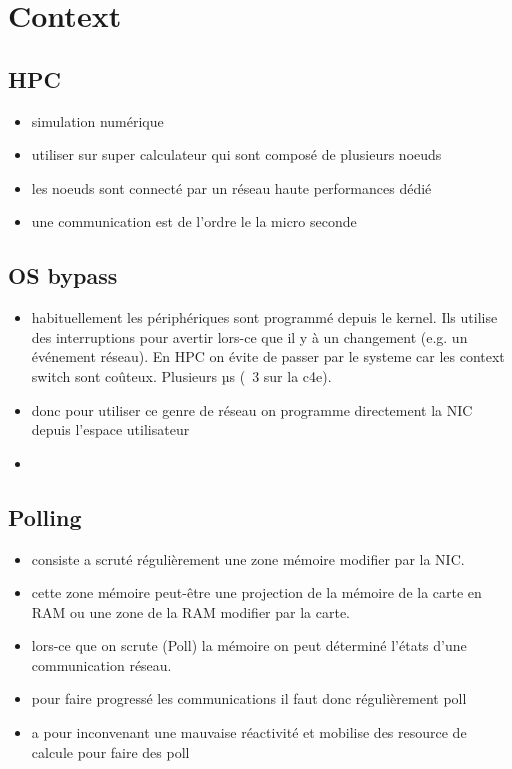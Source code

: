 \section{Context}

\subsection{HPC}

\begin{itemize}
  \item simulation numérique
  \item utiliser sur super calculateur qui sont composé de plusieurs noeuds
  \item les noeuds sont connecté par un réseau haute performances dédié
  \item une communication est de l'ordre le la micro seconde
\end{itemize}

\subsection{OS bypass}

\begin{itemize}
  \item habituellement les périphériques sont programmé depuis le kernel.
  Ils utilise des interruptions pour avertir lors-ce que il y à un changement (e.g. un événement réseau).
  En HPC on évite de passer par le systeme car les context switch sont coûteux.
  Plusieurs µs (~3 sur la c4e).
  \item donc pour utiliser ce genre de réseau on programme directement la NIC depuis l'espace utilisateur
  \item 
\end{itemize}

\subsection{Polling}

\begin{itemize}
  \item consiste a scruté régulièrement une zone mémoire modifier par la NIC.
  \item cette zone mémoire peut-être une projection de la mémoire de la carte en RAM ou une zone de la RAM modifier par la carte.
  \item lors-ce que on scrute (Poll) la mémoire on peut déterminé l'états d'une communication réseau.
  \item pour faire progressé les communications il faut donc régulièrement poll
  \item a pour inconvenant une mauvaise réactivité et mobilise des resource de calcule pour faire des poll
\end{itemize}

